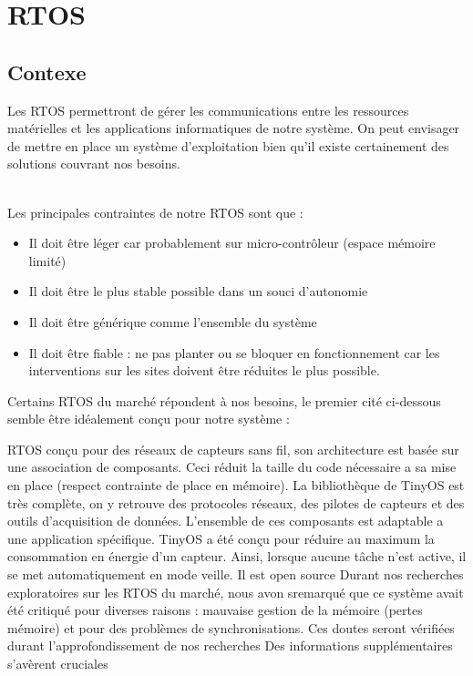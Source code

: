 \section{RTOS}
	\subsection {Contexe}
		Les RTOS permettront de gérer les communications entre les ressources matérielles et les applications informatiques de notre système. On peut envisager de mettre en place un système d'exploitation bien qu'il existe certainement des solutions couvrant nos besoins. \\~
		
		Les principales contraintes de notre RTOS sont que :
		\begin{itemize}
				\item Il doit être léger car probablement sur micro-contrôleur (espace mémoire limité)
				\item Il doit être le plus stable possible dans un souci d'autonomie
				\item Il doit être générique comme l'ensemble du système
				\item Il doit être fiable : ne pas planter ou se bloquer en fonctionnement car les interventions sur les sites doivent être réduites le plus possible.
		\end{itemize}

		Certains RTOS du marché répondent à nos besoins, le premier cité ci-dessous semble être idéalement conçu pour notre système :
		
		
{RTOS conçu pour des réseaux de capteurs sans fil, son architecture est basée sur une association de composants.}
{Ceci réduit la taille du code nécessaire a sa mise en place (respect contrainte de place en mémoire). La bibliothèque de TinyOS est très complète, on y retrouve des protocoles réseaux, des pilotes de capteurs et des outils d'acquisition de données. L'ensemble de ces composants est adaptable a une application spécifique.}
{TinyOS a été conçu pour réduire au maximum la consommation en énergie d’un capteur. Ainsi, lorsque aucune tâche n’est active, il se met automatiquement en mode veille.}
{Il est open source}
{Durant nos recherches exploratoires sur les RTOS du marché, nous avon sremarqué que ce système avait été critiqué pour diverses raisons : mauvaise
gestion de la mémoire (pertes mémoire) et pour des problèmes de synchronisations. Ces doutes seront vérifiées durant l'approfondissement de nos recherches}
{Des informations supplémentaires s'avèrent cruciales}


